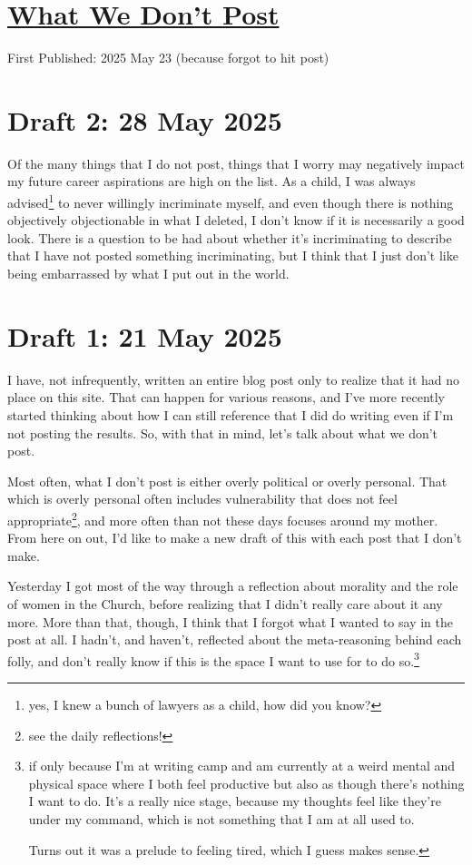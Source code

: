 \documentclass[12pt]{article}
\renewcommand{\,}{\textsuperscript{,}}
\begin{document}
  
\doublespacing  
\section{\href{what-we-dont-post.html}{What We Don't Post}}  
First Published: 2025 May 23 (because forgot to hit post)

\section{Draft 2: 28 May 2025}

Of the many things that I do not post, things that I worry may negatively impact my future career aspirations are high on the list.
As a child, I was always advised\footnote{yes, I knew a bunch of lawyers as a child, how did you know?} to never willingly incriminate myself, and even though there is nothing objectively objectionable in what I deleted, I don't know if it is necessarily a good look.
There is a question to be had about whether it's incriminating to describe that I have not posted something incriminating, but I think that I just don't like being embarrassed by what I put out in the world.

\section{Draft 1: 21 May 2025}

I have, not infrequently, written an entire blog post only to realize that it had no place on this site.  
That can happen for various reasons, and I've more recently started thinking about how I can still reference that I did do writing even if I'm not posting the results.  
So, with that in mind, let's talk about what we don't post.

Most often, what I don't post is either overly political or overly personal.  
That which is overly personal often includes vulnerability that does not feel appropriate\footnote{see the daily reflections!}, and more often than not these days focuses around my mother.  
From here on out, I'd like to make a new draft of this with each post that I don't make.

Yesterday I got most of the way through a reflection about morality and the role of women in the Church, before realizing that I didn't really care about it any more.  
More than that, though, I think that I forgot what I wanted to say in the post at all.  
I hadn't, and haven't, reflected about the meta-reasoning behind each folly, and don't really know if this is the space I want to use for to do so.\footnote{if only because I'm at writing camp and am currently at a weird mental and physical space where I both feel productive but also as though there's nothing I want to do. It's a really nice stage, because my thoughts feel like they're under my command, which is not something that I am at all used to.

Turns out it was a prelude to feeling tired, which I guess makes sense.}
\end{document}
